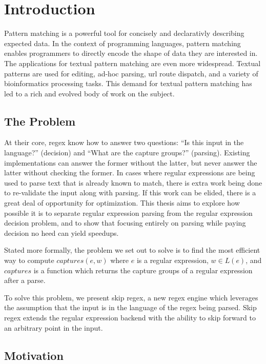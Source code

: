 \chapter{Introduction}
\label{chapter:introduction}

Pattern matching is a powerful tool for concisely and declarativly
describing expected data. In the context of programming languages,
pattern matching enables programmers to directly encode the shape
of data they are interested in. The applications for textual pattern
matching are even more widespread. Textual patterns are used for
editing, ad-hoc parsing, url route dispatch, and a variety of
bioinformatics processing tasks. This demand for textual pattern
matching has led to a rich and evolved body of work on the subject.

\section{The Problem}

At their core, regex know how to answer two questions: ``Is this
input in the language?'' (decision) and ``What are the capture
groups?'' (parsing). Existing implementations can answer the former
without the latter, but never answer the latter without checking
the former. In cases where regular expressions are being used to
parse text that is already known to match, there is extra work being done
to re-validate the input along with parsing. If this work can be
elided, there is a great deal of opportunity for optimization.
This thesis aims to explore how possible it is to separate regular
expression parsing from the regular expression decision problem,
and to show that focusing entirely on parsing while paying decision
no heed can yield speedups.

Stated more formally, the problem we set out to solve is to find
the most efficient way to compute $captures(e, w)$ where $e$ is
a regular expression, $w \in L(e)$, and $captures$ is a function
which returns the capture groups of a regular expression after
a parse.

To solve this problem, we present skip regex, a new regex engine
which leverages the assumption that the input is in the language
of the regex being parsed. Skip regex extends the regular expression
backend with the ability to skip forward to an arbitrary point in the
input.

\section{Motivation}

